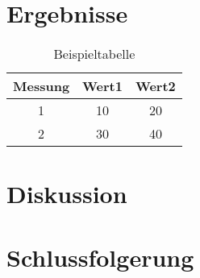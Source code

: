 \documentclass{article}
\begin{document}
\section{Ergebnisse}

\begin{table}[H]
    \centering
    \begin{tabular}{|c|c|c|}
    \hline
    Messung & Wert1 & Wert2 \\
    \hline
    1 & 10 & 20 \\
    2 & 30 & 40 \\
    \hline
    \end{tabular}
    \caption{Beispieltabelle}
    \label{tab:beispiel}
\end{table}


\section{Diskussion}

\section{Schlussfolgerung}



\end{document}
